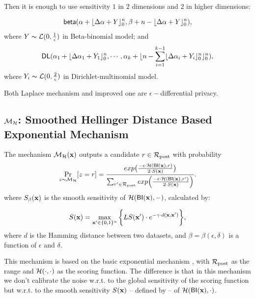 \documentclass{article}
\begin{document}
 Then it is enough to use sensitivity $1$ in 2 dimensions and $2$ in higher dimensions:

 \[
 \mathsf{beta}(\alpha +  \lfloor{\Delta \alpha + Y}\rfloor^n_0,\beta + n - \lfloor{\Delta \alpha + Y}\rfloor^n_0),
 \]
 where $Y \thicksim \mathcal{L}(0, \frac{1}{\epsilon})$ in Beta-binomial model; and
 \[
 \mathsf{DL}(\alpha_1 +  \lfloor{\Delta \alpha_1 + Y_1}\rfloor^n_0, \cdots, \alpha_k + \lfloor n - \sum_{i = 1}^{k-1}\lfloor{\Delta \alpha_i + Y_i}\rfloor^n_0 \rfloor^n_0),
 \]
where $Y_i \thicksim \mathcal{L}(0, \frac{2}{\epsilon})$ in Dirichlet-multinomial model.

Both Laplace mechanism and improved one are $\epsilon -$differential privacy\cite{dwork2014algorithmic}.


\subsection{$\mathcal{M}_{\mathcal{H}}$: Smoothed Hellinger Distance Based Exponential Mechanism}
\label{subsec_hexpmech}

\begin{definition}
\label{def_smoo}
The mechanism $\mathcal{M}_{\mathcal{H}}(\textbf{x})$ outputs a candidate $r \in \mathcal{R}_{\textup{post}}$ with probability
\begin{equation*}
\underset{z \thicksim \mathcal{M}_{\mathcal{H}}}{\Pr}[z=r] = \frac {exp\big(\frac{-\epsilon\cdot\mathcal{H}(\mathsf{BI}(\textbf{x}),r)}{2\cdot S(\textbf{x})}\big)}
{\sum_{r'\in\mathcal{R}_{\textup{post}}} exp\Big(\frac{-\epsilon\cdot\mathcal{H}(\mathsf{BI}(\textbf{x}),r')}{2\cdot S(\textbf{x})}\Big)}.
\end{equation*}
where $S_\beta(\textbf{x})$ is the smooth sensitivity of $\mathcal{H}(\mathsf{BI}(\textbf{x}),-)$, calculated by:

\begin{equation}
  \label{eq:smooth}
   S(\textbf{x})=\max_{\textbf{x}' \in \{0,1\}^{n}}\bigg \{LS(\textbf{x}') \cdot e^{-\gamma\cdot d(\textbf{x},\textbf{x}')}\bigg\},
\end{equation}
where $d$ is the Hamming distance between two datasets, and $\beta =
\beta(\epsilon, \delta)$ is a function of $\epsilon$ and $\delta$. 
\end{definition}

This mechanism is based on the basic exponential mechanism
\cite{talwar}, with $\mathcal{R}_{\textup{post}}$ as the range and
$\mathcal{H}(\cdot,\cdot)$ as the scoring function. The difference is
that in this mechanism we don't calibrate the noise w.r.t. to the
global sensitivity of the scoring function but w.r.t. to the smooth
sensitivity $S(\textbf{x})$ -- defined by \cite{nissim2007smooth}-- of
$\mathcal{H}(\mathsf{BI}(\textbf{x}), \cdot)$.
\end{document}
